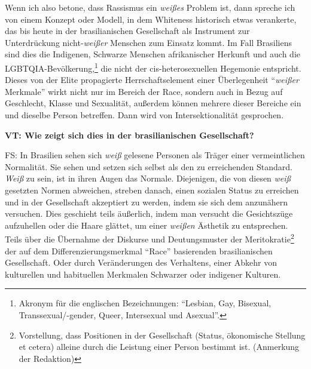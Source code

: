 \documentclass[a4paper,
fontsize=11pt,
oneside,
numbers=noperiodatend,
parskip=half-,
bibliography=totoc,
final
]{scrartcl}
\begin{document}
Wenn ich also betone, dass Rassismus ein \emph{weißes} Problem ist, dann
spreche ich von einem Konzept oder Modell, in dem Whiteness historisch
etwas verankerte, das bis heute in der brasilianischen Gesellschaft als
Instrument zur Unterdrückung nicht-\emph{weißer} Menschen zum Einsatz
kommt. Im Fall Brasiliens sind dies die Indigenen, Schwarze Menschen
afrikanischer Herkunft und auch die LGBTQIA-Bevölkerung,\footnote{Akronym
  für die englischen Bezeichnungen: \enquote{Lesbian, Gay, Bisexual,
  Transsexual/-gender, Queer, Intersexual und Asexual}.} die nicht der
cis-heterosexuellen Hegemonie entspricht. Dieses von der Elite
propagierte Herrschaftselement einer Überlegenheit
\enquote{\emph{weißer} Merkmale} wirkt nicht nur im Bereich der Race,
sondern auch in Bezug auf Geschlecht, Klasse und Sexualität, außerdem
können mehrere dieser Bereiche ein und dieselbe Person betreffen. Dann
wird von Intersektionalität gesprochen.

\textbf{VT: Wie zeigt sich dies in der brasilianischen Gesellschaft?}

FS: In Brasilien sehen sich \emph{weiß} gelesene Personen als Träger
einer vermeintlichen Normalität. Sie sehen und setzen sich selbst als
den zu erreichenden Standard. \emph{Weiß} zu sein, ist in ihren Augen
das Normale. Diejenigen, die von diesen \emph{weiß} gesetzten Normen
abweichen, streben danach, einen sozialen Status zu erreichen und in der
Gesellschaft akzeptiert zu werden, indem sie sich dem anzunähern
versuchen. Dies geschieht teils äußerlich, indem man versucht die
Gesichtszüge aufzuhellen oder die Haare glättet, um einer \emph{weißen}
Ästhetik zu entsprechen. Teils über die Übernahme der Diskurse und
Deutungsmuster der Meritokratie\footnote{Vorstellung, dass Positionen in
  der Gesellschaft (Status, ökonomische Stellung et cetera) alleine
  durch die Leistung einer Person bestimmt ist. (Anmerkung der
  Redaktion)} der auf dem Differenzierungsmerkmal \enquote{Race}
basierenden brasilianischen Gesellschaft. Oder durch Veränderungen des
Verhaltens, einer Abkehr von kulturellen und habituellen Merkmalen
Schwarzer oder indigener Kulturen.
\end{document}
